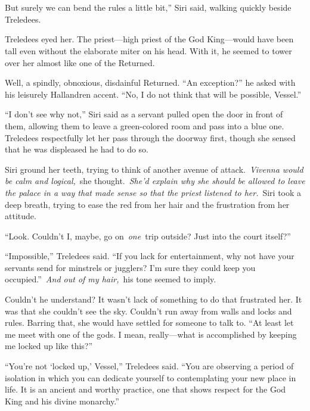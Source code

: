 \chapter{}

But surely we can bend the rules a little bit,” Siri said, walking quickly beside Treledees.

Treledees eyed her. The priest—high priest of the God King—would have been tall even without the elaborate miter on his head. With it, he seemed to tower over her almost like one of the Returned.

Well, a spindly, obnoxious, disdainful Returned. “An exception?” he asked with his leisurely Hallandren accent. “No, I do not think that will be possible, Vessel.”

“I don’t see why not,” Siri said as a servant pulled open the door in front of them, allowing them to leave a green-colored room and pass into a blue one. Treledees respectfully let her pass through the doorway first, though she sensed that he was displeased he had to do so.

Siri ground her teeth, trying to think of another avenue of attack.~\textit{Vivenna would be calm and logical,}~she thought.~\textit{She’d explain why she should be allowed to leave the palace in a way that made sense so that the priest listened to her.}~Siri took a deep breath, trying to ease the red from her hair and the frustration from her attitude.

“Look. Couldn’t I, maybe, go on~\textit{one}~trip outside? Just into the court itself?”

“Impossible,” Treledees said. “If you lack for entertainment, why not have your servants send for minstrels or jugglers? I’m sure they could keep you occupied.”~\textit{And out of my hair,}~his tone seemed to imply.

Couldn’t he understand? It wasn’t lack of something to do that frustrated her. It was that she couldn’t see the sky. Couldn’t run away from walls and locks and rules. Barring that, she would have settled for someone to talk to. “At least let me meet with one of the gods. I mean, really—what is accomplished by keeping me locked up like this?”

“You’re not ‘locked up,’ Vessel,” Treledees said. “You are observing a period of isolation in which you can dedicate yourself to contemplating your new place in life. It is an ancient and worthy practice, one that shows respect for the God King and his divine monarchy.”

